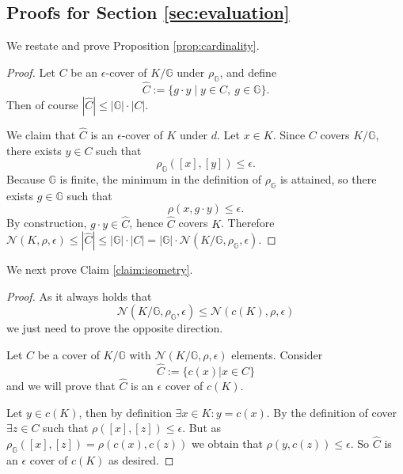 \documentclass{article}
\theoremstyle{definition}
\theoremstyle{plain}
\newcommand{\G}{\mathbb{G}}
\newcommand{\N}{\mathcal{N}}
\begin{document}
\subsection{Proofs for Section \ref{sec:evaluation}}
We restate and prove Proposition \ref{prop:cardinality}.
\cardinality*
\begin{proof}
\label{upper_bound}
Let $C$ be an $\epsilon$-cover of $K/\G$ under $\rho_{\G}$, and define
\[
\widehat{C}:=\{g\cdot y \mid y\in C,\ g\in \G\}.
\]
Then of course $|\widehat{C}|\le |\G|\cdot |C|$.

We claim that $\widehat{C}$ is an $\epsilon$-cover of $K$ under $d$.
Let $x\in K$. Since $C$ covers $K/\G$, there exists $y\in C$ such that
\[
\rho_{\G}([x],[y])\le \epsilon.
\]
Because $\G$ is finite, the minimum in the definition of $\rho_{\G}$ is attained, so there exists $g\in \G$ such that
\[
\rho(x, g\cdot y)\le \epsilon.
\]
By construction, $g\cdot y\in \widehat{C}$, hence $\widehat{C}$ covers $K$.
Therefore $\N(K,\rho,\epsilon)\le |\widehat{C}|\le |\G|\cdot |C| = |\G|\cdot \N(K/\G,\rho_{\G},\epsilon)$.
\end{proof}
We next prove Claim \ref{claim:isometry}.
\isometry*
\label{Proof_isometry}
\begin{proof}
    As it always holds that \[\N(K/\G,\rho_{\G},\epsilon)\leq \N(c(K),\rho,\epsilon)\] we just need to prove the opposite direction.
    
    Let $C$ be a cover of $K/\G$ with $\N(K/\G,\rho,\epsilon)$ elements.
    Consider \[\hat{C}:=\{c(x)|x \in C \}\] and we will prove that $\hat{C}$ is an $\epsilon$ cover of $c(K)$.
    
    Let $y \in c(K)$, then by definition $\exists x \in K: y = c(x)$. By the definition of cover $\exists z\in C$ such that $\rho([x],[z])\leq \epsilon$. But as $\rho_{\G}([x],[z])=\rho(c(x),c(z))$ we obtain that $\rho(y,c(z))\leq \epsilon$. So $\hat{C}$ is an $\epsilon$ cover of $c(K)$ as desired. 
\end{proof}
\end{document}
